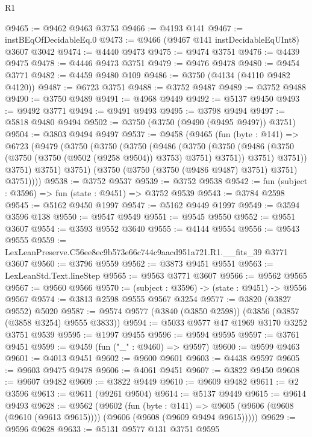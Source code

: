 \begin{lexlean}{R1}
\begin{coremodule}
@9465 := @9462 @9463 @3753
@9466 := @4193 @141
@9467 := instBEqOfDecidableEq.{0}
@9473 := @9466 (@9467 @141 instDecidableEqUInt8) @3607 @3042
@9474 := @4440 @9473
@9475 := @9474 @3751
@9476 := @4439 @9475
@9478 := @4446 @9473 @3751
@9479 := @9476 @9478
@9480 := @9454 @3771
@9482 := @4459 @9480 @109
@9486 := @3750 (@4134 (@4110 @9482 @4120))
@9487 := @6723 @3751
@9488 := @3752 @9487
@9489 := @3752 @9488
@9490 := @3750 @9489
@9491 := @4968 @9449
@9492 := @5137 @9450
@9493 := @9492 @3771
@9494 := @9491 @9493
@9495 := @3798 @9494
@9497 := @5818 @9480 @9494
@9502 := @3750 (@3750 (@9490 (@9495 @9497)) @3751)
@9504 := @3803 @9494 @9497
@9537 := @9458
    (@9465
      (fun (byte : @141) =>
      @6723
        (@9479
          (@3750
            (@3750
              (@3750
                (@9486
                  (@3750
                    (@3750
                      (@9486 (@3750 (@3750 (@3750 (@9502 (@9258 @9504)) @3753) @3751) @3751))
                      @3751)
                    @3751))
                @3751)
              @3751)
            @3751)
          (@3750 (@3750 (@3750 (@9486 @9487) @3751) @3751) @3751))))
@9538 := @3752 @9537
@9539 := @3752 @9538
@9542 := fun (subject : @3596) => fun (state : @9451) => @3752 @9539
@9543 := @3784 @2598
@9545 := @5162 @9450 @1997
@9547 := @5162 @9449 @1997
@9549 := @3594 @3596 @138
@9550 := @9547 @9549
@9551 := @9545 @9550
@9552 := @9551 @3607
@9554 := @3593 @9552 @3640
@9555 := @4144 @9554
@9556 := @9543 @9555
@9559 := LexLeanPreserve.C56ee8ec9b573e66c744c9aacd951a721.R1.__fits_39 @3771 @3607
@9560 := @3796 @9559
@9562 := @3873 @9451 @9551
@9563 := LexLeanStd.Text.lineStep
@9565 := @9563 @3771 @3607
@9566 := @9562 @9565
@9567 := @9560 @9566
@9570 := (subject : @3596) -> (state : @9451) -> @9556 @9567
@9574 := @3813 @2598 @9555 @9567 @3254
@9577 := @3820 (@3827 @9552) @5020
@9587 := @9574 @9577 (@3840 (@3850 @2598)) (@3856 (@3857 (@3858 @3254) @9555 @3833))
@9594 := @5033 @9577 @47 @1969 @3170 @3252 @3751 @9539
@9595 := @1997 @9455
@9596 := @9594 @9595
@9597 := @3761 @9451
@9599 := @9459 (fun ("_" : @9460) => @9597)
@9600 := @9599 @9463
@9601 := @4013 @9451
@9602 := @9600 @9601
@9603 := @4438 @9597
@9605 := @9603 @9475 @9478
@9606 := @4061 @9451
@9607 := @3822 @9450
@9608 := @9607 @9482
@9609 := @3822 @9449
@9610 := @9609 @9482
@9611 := @2 @3596
@9613 := @9611 (@9261 @9504)
@9614 := @5137 @9449
@9615 := @9614 @9493
@9628 := @9562
    (@9602
      (fun (byte : @141) =>
      @9605 (@9606 (@9608 (@9610 (@9613 @9615)))) (@9606 (@9608 (@9609 @9494 @9615)))))
@9629 := @9596 @9628
@9633 := @5131 @9577 @131 @3751 @9595

\end{coremodule}
\end{lexlean}
